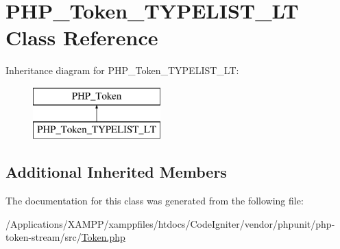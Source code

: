 \hypertarget{class_p_h_p___token___t_y_p_e_l_i_s_t___l_t}{}\section{P\+H\+P\+\_\+\+Token\+\_\+\+T\+Y\+P\+E\+L\+I\+S\+T\+\_\+\+LT Class Reference}
\label{class_p_h_p___token___t_y_p_e_l_i_s_t___l_t}
Inheritance diagram for P\+H\+P\+\_\+\+Token\+\_\+\+T\+Y\+P\+E\+L\+I\+S\+T\+\_\+\+LT\+:\begin{figure}[H]
\begin{center}
\leavevmode
\includegraphics[height=2.000000cm]{class_p_h_p___token___t_y_p_e_l_i_s_t___l_t}
\end{center}
\end{figure}
\subsection*{Additional Inherited Members}


The documentation for this class was generated from the following file\+:\begin{DoxyCompactItemize}
\item 
/\+Applications/\+X\+A\+M\+P\+P/xamppfiles/htdocs/\+Code\+Igniter/vendor/phpunit/php-\/token-\/stream/src/\mbox{\hyperlink{_token_8php}{Token.\+php}}\end{DoxyCompactItemize}
